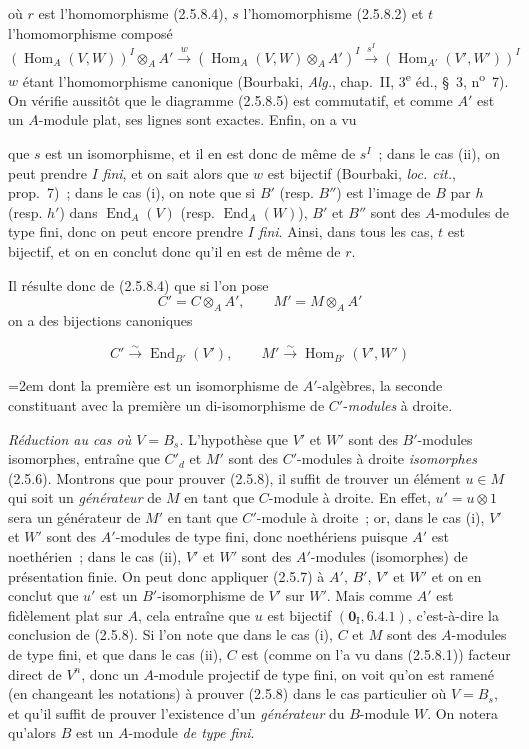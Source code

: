 où $r$ est l'homomorphisme (2.5.8.4), $s$ l'homomorphisme (2.5.8.2) et
$t$ l'homomorphisme composé
\[
(\operatorname{Hom}_A(V,W))^I\otimes_A A'
\xrightarrow{w}(\operatorname{Hom}_A(V,W)\otimes_A A')^I
\xrightarrow{s^I}(\operatorname{Hom}_{A'}(V',W'))^I
\]
$w$ étant l'homomorphisme canonique (Bourbaki, \emph{Alg.}, chap.~II,
3\textsuperscript{e} éd., \S~3, n\textsuperscript{o}~7). On vérifie aussitôt
que le diagramme (2.5.8.5) est commutatif, et comme $A'$ est un $A$-module
plat, ses lignes sont exactes. Enfin, on a vu

que $s$ est un isomorphisme, et il en est donc de même de $s^I$~; dans le cas
(ii), on peut prendre $I$ \emph{fini}, et on sait alors que $w$ est bijectif
(Bourbaki, \emph{loc. cit.}, prop.~7)~; dans le cas (i), on note que si $B'$
(resp. $B''$) est l'image de $B$ par $h$ (resp. $h'$) dans
$\operatorname{End}_A(V)$ (resp. $\operatorname{End}_A(W)$), $B'$ et $B''$
sont des $A$-modules de type fini, donc on peut encore prendre $I$ \emph{fini}.
Ainsi, dans tous les cas, $t$ est bijectif, et on en conclut donc qu'il en est
de même de $r$.

Il résulte donc de (2.5.8.4) que si l'on pose
\[
C'=C\otimes_A A',\qquad M'=M\otimes_A A'
\]
on a des bijections canoniques

\begin{env}[2.5.8.6]
\label{IV.2.5.8.6-fr}
\[
C'\xrightarrow{\sim}\operatorname{End}_{B'}(V'),\qquad
M'\xrightarrow{\sim}\operatorname{Hom}_{B'}(V',W')
\]
{\emergencystretch=2em
dont la première est un isomorphisme de $A'$-algèbres, la seconde constituant
avec la première un di-isomorphisme de $C'$-\emph{modules} à droite.\par}
\end{env}

\begin{env}[2.5.8.7]
\label{IV.2.5.8.7-fr}
\emph{Réduction au cas où $V=B_s$.} L'hypothèse que $V'$ et $W'$ sont des
$B'$-modules isomorphes, entraîne que $C'_d$ et $M'$ sont des $C'$-modules à
droite \emph{isomorphes} (2.5.6). Montrons que pour prouver (2.5.8), il suffit de
trouver un élément $u\in M$ qui soit un \emph{générateur} de $M$ en tant que
$C$-module à droite. En effet, $u'=u\otimes1$ sera un générateur de $M'$ en
tant que $C'$-module à droite~; or, dans le cas (i), $V'$ et $W'$ sont des
$A'$-modules de type fini, donc noethériens puisque $A'$ est noethérien~;
dans le cas (ii), $V'$ et $W'$ sont des $A'$-modules (isomorphes) de
présentation finie. On peut donc appliquer (2.5.7) à $A'$, $B'$, $V'$ et
$W'$ et on en conclut que $u'$ est un $B'$-isomorphisme de $V'$ sur $W'$.
Mais comme $A'$ est fidèlement plat sur $A$, cela entraîne que $u$ est
bijectif $(\mathbf{0}_{\mathrm I},6.4.1)$, c'est-à-dire la conclusion de (2.5.8). Si
l'on note que dans le cas (i), $C$ et $M$ sont des $A$-modules de type fini,
et que dans le cas (ii), $C$ est (comme on l'a vu dans (2.5.8.1)) facteur
direct de $V^n$, donc un $A$-module projectif de type fini, on voit qu'on est
ramené (en changeant les notations) à prouver (2.5.8) dans le cas particulier
où $V=B_s$, et qu'il suffit de prouver l'existence d'un \emph{générateur} du
$B$-module $W$. On notera qu'alors $B$ est un $A$-module \emph{de type fini}.
\end{env}

